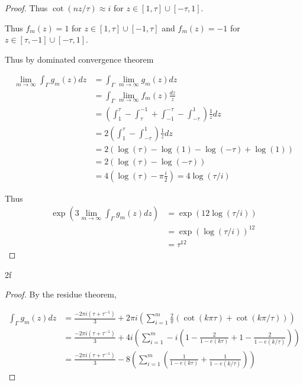 \documentclass{article}
\begin{document}
\begin{proof}
    Thus $\cot(n z / \tau) \approx i$ for $z \in [1, \tau] \cup [-\tau, 1]$. 

    Thus $f_m(z) = 1$ for $z \in [1, \tau] \cup [-1, \tau]$  and $f_m(z) = -1$ for $z \in [\tau, -1] \cup [-\tau, 1]$. 
    
    Thus by dominated convergence theorem 

    \begin{align*}
        \lim_{m \to \infty} \int_{\Gamma} g_m(z) dz &= \int_{\Gamma} \lim_{m \to \infty} g_m(z) dz \\
        &= \int_{\Gamma} \lim_{m \to \infty} f_m(z) \frac{dz}{z} \\
        &= \left(\int_{1}^{\tau} - \int_{\tau}^{-1} + \int_{-1}^{-\tau} - \int_{-\tau}^1\right) \frac{1}{z} dz \\
        &= 2\left(\int_1^\tau - \int_{-\tau}^1\right)\frac{1}{z} dz \\
        &= 2(\log(\tau) - \log(1) - \log(-\tau) + \log(1)) \\
        &= 2(\log(\tau) - \log(-\tau)) \\
        &= 4(\log(\tau) - \pi \frac{i}{2}) = 4\log(\tau / i)
    \end{align*}

    Thus \begin{align*}
        \exp(3 \lim_{m \to \infty} \int_{\Gamma} g_m(z) dz) &= \exp(12 \log(\tau / i)) \\
        &= \exp(\log(\tau / i))^{12} \\
        &= \tau^{12}
    \end{align*} 
\end{proof}

\begin{PROB}{2f}\label{Problem 2f.}
\end{PROB}
\begin{proof}
    By the residue theorem, 

    \begin{align*}
        \int_{\Gamma} g_m(z) dz &= \frac{-2 \pi i \left(\tau + \tau^{-1}\right)}{3} + 2 \pi i\left(\sum_{i = 1}^{m} \frac{2}{\pi} \left(\cot(k \pi \tau) + \cot(k \pi / \tau)\right)\right) \\
        &= \frac{-2 \pi i \left(\tau + \tau^{-1}\right)}{3} + 4i\left(\sum_{i = 1}^{m} -i \left(1 - \frac{2}{1 - e(k \tau)} + 1 - \frac{2}{1 - e(k / \tau)}\right)\right) \\
        &= \frac{-2 \pi i \left(\tau + \tau^{-1}\right)}{3} - 8\left(\sum_{i = 1}^{m} \left(\frac{1}{1 - e(k \tau)} + \frac{1}{1 - e(k / \tau)}\right)\right)
    \end{align*}

\end{proof}
\end{document}
